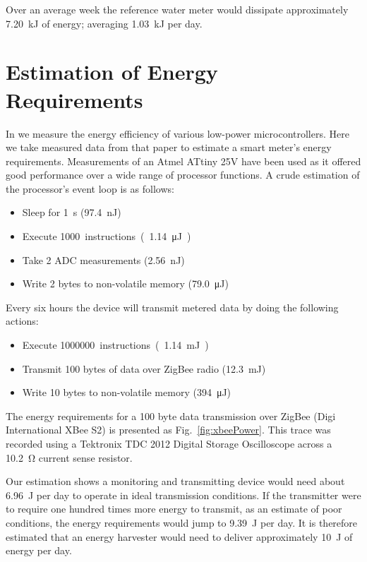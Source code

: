 \documentclass[10pt,final,journal]{IEEEtran}
\begin{document}
        Over an average week the reference water meter would dissipate approximately \SI{7.20}{\kilo\joule} of energy; averaging \SI{1.03}{\kilo\joule} per day.

    \section{Estimation of Energy Requirements}
        \label{sect:powerRequirements}
        In \cite{Jones2011} we measure the energy efficiency of various low-power microcontrollers.
        Here we take measured data from that paper to estimate a smart meter's energy requirements.
        Measurements of an Atmel ATtiny 25V have been used as it offered good performance over a wide range of processor functions.
        A crude estimation of the processor's event loop is as follows:
        \begin{itemize}
        \item Sleep for \SI{1}{\second} (\SI{97.4}{\nano\joule})
        \item Execute \SI{1000} instructions (\SI{1.14}{\micro\joule})
        \item Take 2 ADC measurements (\SI{2.56}{\nano\joule})
        \item Write 2 bytes to non-volatile memory (\SI{79.0}{\micro\joule})
        \end{itemize}
        Every six hours the device will transmit metered data by doing the following actions:
        \begin{itemize}
        \item Execute \SI{1000000} instructions (\SI{1.14}{\milli\joule})
        \item Transmit 100 bytes of data over ZigBee radio (\SI{12.3}{\milli\joule})
        \item Write 10 bytes to non-volatile memory (\SI{394}{\micro\joule})
        \end{itemize}

        The energy requirements for a 100 byte data transmission over ZigBee (Digi International XBee S2) is presented as Fig.~\ref{fig:xbeePower}.
        This trace was recorded using a Tektronix TDC 2012 Digital Storage Oscilloscope across a \SI{10.2}{\ohm} current sense resistor.

        Our estimation shows a monitoring and transmitting device would need about \SI{6.96}{\joule} per day to operate in ideal transmission conditions.
        If the transmitter were to require one hundred times more energy to transmit, as an estimate of poor conditions, the energy requirements would jump to \SI{9.39}{\joule} per day.
        It is therefore estimated that an energy harvester would need to deliver approximately \SI{10}{\joule} of energy per day.
\end{document}
